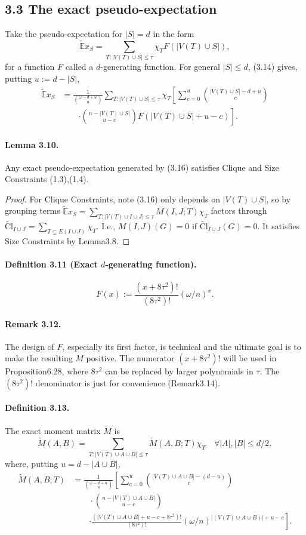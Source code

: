 \documentclass[10pt,a4paper]{article}
\begin{document}
\subsection*{3.3 The exact pseudo-expectation}
Take the pseudo-expectation for $|S|=d$ in the form
\[\widetilde{\mathbb E}x_S=\sum_{T:|V(T)\cup S|\le\tau}\chi_TF(|V(T)\cup S|),\]
for a function $F$ called a $d$-generating function. For general $|S|\le d$, (3.14) gives, putting $u:=d-|S|$,
\begin{align*}\widetilde{\mathbb E}x_S&=\frac1{\binom{\omega-d+u}u}\sum_{T:|V(T)\cup S|\le\tau}\chi_T\left[\sum_{c=0}^u\binom{|V(T)\cup S|-d+u}c\right.\\&\qquad\left.\cdot\binom{n-|V(T)\cup S|}{u-c}F(|V(T)\cup S|+u-c)\right].\tag{3.16}\end{align*}
\paragraph{Lemma 3.10.} Any exact pseudo-expectation generated by (3.16) satisfies Clique and Size Constraints (1.3),(1.4).
\begin{proof}For Clique Constraints, note (3.16) only depends on $|V(T)\cup S|$, so by grouping terms $\widetilde{\mathbb E}x_S=\sum_{T:|V(T)\cup I\cup J|\le\tau}M(I,J;T)\chi_T$ factors through $\widetilde{\mathrm{Cl}}_{I\cup J}=\sum_{T\subseteq E(I\cup J)}\chi_T$. I.e., $M(I,J)(G)=0$ if $\widetilde{\mathrm{Cl}}_{I\cup J}(G)=0$. It satisfies Size Constraints by Lemma3.8.\end{proof}
\paragraph{Definition 3.11 (Exact $d$-generating function).}
\[F(x):=\frac{(x+8\tau^2)!}{(8\tau^2)!}(\omega/n)^x.\]
\paragraph{Remark 3.12.} The design of $F$, especially its first factor, is technical and the ultimate goal is to make the resulting $M$ positive. The numerator $(x+8\tau^2)!$ will be used in Proposition6.28, where $8\tau^2$ can be replaced by larger polynomials in $\tau$. The $(8\tau^2)!$ denominator is just for convenience (Remark3.14).
\paragraph{Definition 3.13.} The exact moment matrix $\widetilde M$ is
\[\widetilde M(A,B)=\sum_{T:|V(T)\cup A\cup B|\le\tau}\widetilde M(A,B;T)\chi_T\quad\forall |A|,|B|\le d/2,\]
where, putting $u=d-|A\cup B|$,
\begin{align*}\widetilde M(A,B;T)&=\frac1{\binom{\omega-d+u}u}\left[\sum_{c=0}^u\binom{|V(T)\cup A\cup B|-(d-u)}c\right.\\&\qquad\cdot\binom{n-|V(T)\cup A\cup B|}{u-c}\\&\qquad\left.\cdot\frac{(|V(T)\cup A\cup B|+u-c+8\tau^2)!}{(8\tau^2)!}(\omega/n)^{|(V(T)\cup A\cup B)|+u-c}\right].\tag{3.17}\end{align*}
\end{document}
